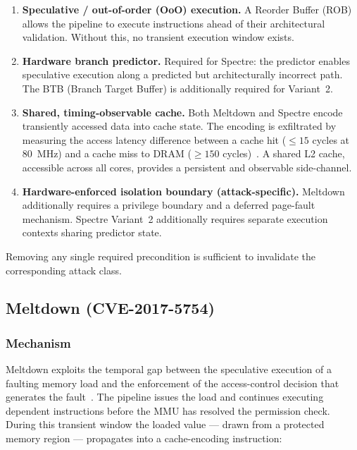 \begin{enumerate}
  \item \textbf{Speculative / out-of-order (OoO) execution.}
        A Reorder Buffer (ROB) allows the pipeline to execute instructions ahead
        of their architectural validation.  Without this, no transient execution
        window exists.
  \item \textbf{Hardware branch predictor.}
        Required for Spectre: the predictor enables speculative execution along
        a predicted but architecturally incorrect path.  The BTB (Branch Target
        Buffer) is additionally required for Variant~2.
  \item \textbf{Shared, timing-observable cache.}
        Both Meltdown and Spectre encode transiently accessed data into cache
        state.  The encoding is exfiltrated by measuring the access latency
        difference between a cache hit ($\leq 15$ cycles at \SI{80}{\mega\hertz})
        and a cache miss to DRAM ($\geq 150$ cycles)~\cite{kocher2019spectre}.
        A shared \mbox{L2} cache, accessible across all cores, provides a
        persistent and observable side-channel.
  \item \textbf{Hardware-enforced isolation boundary (attack-specific).}
        Meltdown additionally requires a privilege boundary and a deferred
        page-fault mechanism.  Spectre Variant~2 additionally requires separate
        execution contexts sharing predictor state.
\end{enumerate}

Removing any single required precondition is sufficient to invalidate the
corresponding attack class.

\subsection{Meltdown (CVE-2017-5754)}
\label{subsec:meltdown}

\subsubsection{Mechanism}

Meltdown exploits the temporal gap between the speculative execution of a
faulting memory load and the enforcement of the access-control decision that
generates the fault~\cite{lipp2018meltdown}.  The pipeline issues the load and
continues executing dependent instructions before the MMU has resolved the
permission check.  During this transient window the loaded value — drawn from a
protected memory region — propagates into a cache-encoding instruction:

